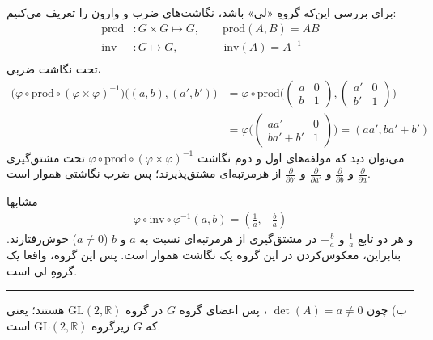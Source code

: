 \documentclass[a4paper, 12pt]{article}
\begin{document}
برای بررسی این‌که گروهِ «لی» باشد، نگاشت‌های ضرب و وارون را تعریف می‌کنیم:
\begin{equation*}
	\begin{aligned}
		\text{prod} &: G \times G \mapsto G, \qquad \text{prod}(A,B) = AB \\
		\text{inv} &: G \mapsto G, \qquad\quad\quad \text{inv}(A) = A^{-1} \\ 
	\end{aligned}
\end{equation*}
تحت نگاشت ضربی،
\begin{equation*}
	\begin{aligned}
		\Big(
		\varphi \circ \text{prod} \circ (\varphi \times \varphi)^{-1}
		\Big) \big(
		(a,b),(a',b')
		\big) &= \varphi \circ \text{prod} \Big(
		\begin{pmatrix}
			a & 0 \\ b & 1
		\end{pmatrix},
		\begin{pmatrix}
			a' & 0 \\ b' & 1
		\end{pmatrix}
		\Big) \\ &= 
		\varphi \big(\begin{pmatrix}
			aa' & 0 \\ ba'+b' & 1
		\end{pmatrix}\big) = (aa',ba'+b')
	\end{aligned}
\end{equation*}
می‌توان دید که مولفه‌های اول و دوم نگاشت 
$\varphi \circ \text{prod} \circ (\varphi \times \varphi)^{-1}$
تحت مشتق‌گیری
$\frac{\partial}{\partial a}$
و 
$\frac{\partial}{\partial b}$
و 
$\frac{\partial}{\partial a'}$
و 
$\frac{\partial}{\partial b'}$
از هرمرتبه‌ای مشتق‌پذیرند؛ پس ضرب نگاشتی هموار است.

مشابها
\begin{equation*}
	\begin{aligned}
		\varphi \circ \text{inv} \circ \varphi^{-1} (a,b) = (\frac{1}{a}, -\frac{b}{a})
	\end{aligned}
\end{equation*}
و هر دو تابع 
$\frac{1}{a}$
و
$-\frac{b}{a}$
در مشتق‌گیری از هرمرتبه‌ای نسبت به $a$ و $b$ ($a\neq 0$)  خوش‌رفتارند. بنابراین، معکوس‌کردن در این گروه یک نگاشت هموار است. پس این گروه، واقعا یک گروهِ لی است.

\par\noindent\rule{\textwidth}{0.6pt}
ب) چون 
$\det(A) =a\neq 0$
، پس اعضای گروه $G$ در گروه 
$\text{GL}(2,\mathbb{R})$
هستند؛ یعنی که $G$ زیرگروه
$\text{GL}(2,\mathbb{R})$
است.
\end{document}

